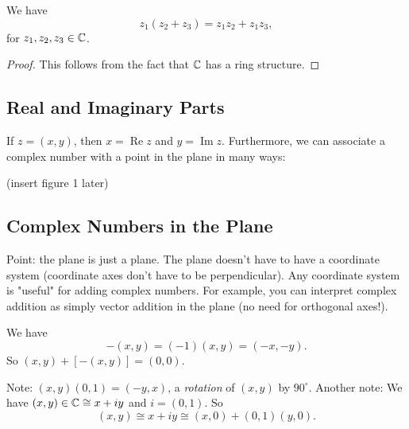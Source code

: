 \begin{theorem}
   We have \[
       z_1(z_2+z_3)=z_1z_2+z_1z_3,
   \]
   for $z_1,z_2,z_3 \in \mathbb{C}$. 
\end{theorem}
\begin{proof}
    This follows from the fact that $\mathbb{C}$ has a ring structure.
\end{proof}
\subsection{Real and Imaginary Parts}
\begin{definition}
    If $z=(x,y)$, then $x=\operatorname{Re}z$ and $y=\operatorname{Im}z.$ Furthermore, we can associate a complex number with a point in the plane in many ways:
\end{definition}
(insert figure 1 later)

\vspace{3mm}

\subsection{Complex Numbers in the Plane}
Point: the plane is just a plane. The plane doesn't have to have a coordinate system (coordinate axes don't have to be perpendicular). Any coordinate system is "useful" for adding complex numbers. For example, you can interpret complex addition as simply vector addition in the plane (no need for orthogonal axes!).

\begin{definition}
    We have \[
        -(x,y)=(-1)(x,y)=(-x,-y).
    \]
    So $(x,y)+[-(x,y)]=(0,0)$.
\end{definition}

Note: $(x,y)(0,1)=(-y,x)$, a \textit{rotation} of $(x,y)$ by $90^{\circ}$.
Another note: We have $(x,y)\in\mathbb{C} \cong x+iy$ and $i=(0,1).$ So 
\[
(x,y) \cong x+iy \cong (x,0)+(0,1)(y,0).
\]
